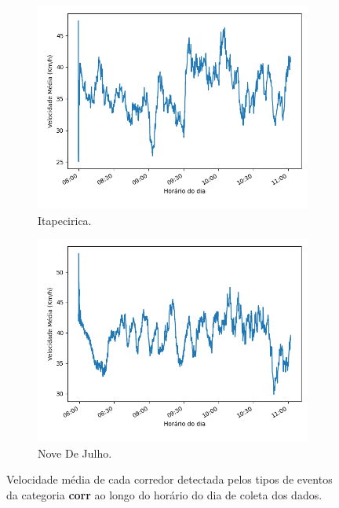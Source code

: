\begin{figure}[ht]
\begin{subfigure}{.45\textwidth}
  \label{fig::avg_speed_Ponte_Baixa}
\end{subfigure}
\centering
\begin{subfigure}{.45\textwidth}
  \centering
\includegraphics[width=\textwidth]{figuras/detect_graphics/avg_speed_7-dez-su-corr_Itapecerica.png}
\caption{Itapecirica.}
\label{fig::avg_speed_Itapecirica}
\end{subfigure}%
\begin{subfigure}{.45\textwidth}
 \centering
 \includegraphics[width=\textwidth]{figuras/detect_graphics/avg_speed_7-dez-su-corr_NoveDeJulho.png}
 \caption{Nove De Julho.}
 \label{fig::avg_speed_Nove_de_Julho}
\end{subfigure}
 \caption{Velocidade média de cada corredor detectada pelos tipos de eventos da categoria \textbf{corr} ao longo do horário do dia de coleta dos dados.}
\end{figure}
